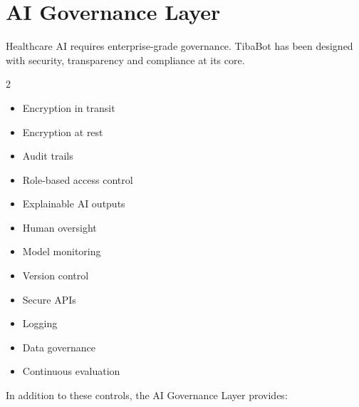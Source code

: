 
\section{AI Governance Layer}

Healthcare AI requires enterprise-grade governance. TibaBot has been designed with security, transparency and compliance at its core.

\vspace{4mm}

\begin{partnerbox}

\begin{multicols}{2}

\begin{itemize}

\item Encryption in transit

\item Encryption at rest

\item Audit trails

\item Role-based access control

\item Explainable AI outputs

\item Human oversight

\item Model monitoring

\item Version control

\item Secure APIs

\item Logging

\item Data governance

\item Continuous evaluation

\end{itemize}

\end{multicols}

\end{partnerbox}

In addition to these controls, the AI Governance Layer provides:

